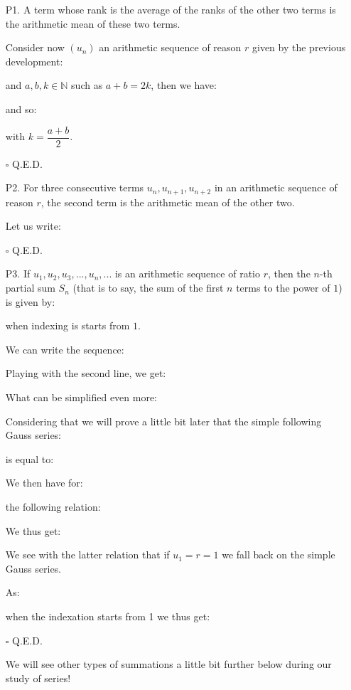 	\begin{enumerate}
		\item[P1.] A term whose rank is the average of the ranks of the other two terms is the arithmetic mean of these two terms.
		\begin{dem}
		Consider now $(u_n)$ an arithmetic sequence of reason $r$ given by the previous development:
			
and $a,b,k \in \mathbb{N}$ such as $a+b=2k$, then we have:
			
and so:
		
with $k=\dfrac{a+b}{2}$.
		\begin{flushright}
			$\square$  Q.E.D.
		\end{flushright}
\end{dem}
	\item[P2.] For three consecutive terms $u_n,u_{n+1},u_{n+2}$ in an arithmetic sequence of reason $r$, the second term is the arithmetic mean of the other two.
		\begin{dem}
			Let us write:
				
				\begin{flushright}
					$\square$  Q.E.D.
				\end{flushright}
		\end{dem}
	\item[P3.] If $u_1,u_2,u_3,...,u_n,...$ is an arithmetic sequence of ratio $r$, then the $n$-th partial sum $S_n$ (that is to say, the sum of the first $n$ terms to the power of $1$) is given by:
		
when indexing is starts from $1$.
		\begin{dem}
			We can write the sequence:
				
		Playing with the second line, we get:
			
What can be simplified even more:
			
Considering that we will prove a little bit later that the simple following Gauss series:
			
is equal to:
			
We then have for:
			
the following relation:
			
We thus get:
			
We see with the latter relation that if $u_1=r=1$ we fall back on the simple Gauss series.

As:
			
when the indexation starts from 1 we thus get:
			
			\begin{flushright}
				$\square$  Q.E.D.
			\end{flushright}
		\end{dem}
We will see other types of summations a little bit further below during our study of series!
	\end{enumerate}
	
